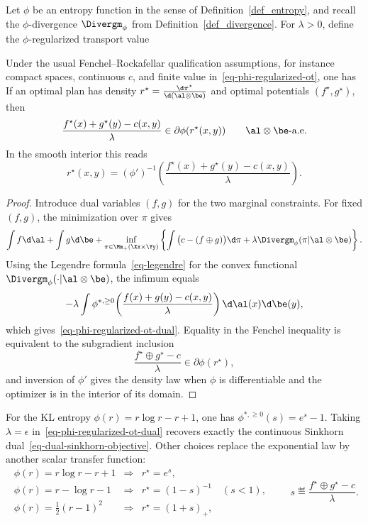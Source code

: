 Let $\phi$ be an entropy function in the sense of Definition~\ref{def_entropy}, and recall the $\phi$-divergence $\Divergm_\phi$ from Definition~\ref{def_divergence}. For $\lambda>0$, define the $\phi$-regularized transport value

\begin{prop}\label{prop-phi-regularized-ot-dual}
	Under the usual Fenchel--Rockafellar qualification assumptions, for instance compact spaces, continuous $c$, and finite value in~\eqref{eq-phi-regularized-ot}, one has
	If an optimal plan has density $r^\star=\frac{\d\pi^\star}{\d(\al\otimes\be)}$ and optimal potentials $(f^\star,g^\star)$, then
	\[
		\frac{f^\star(x)+g^\star(y)-c(x,y)}{\lambda}
		\in
		\partial\phi(r^\star(x,y))
		\qquad
		\al\otimes\be\text{-a.e.}
	\]
	In the smooth interior this reads
	\[
		r^\star(x,y)
		=
		(\phi')^{-1}
		\!\left(\frac{f^\star(x)+g^\star(y)-c(x,y)}{\lambda}\right).
	\]
\end{prop}

\begin{proof}
	Introduce dual variables $(f,g)$ for the two marginal constraints. For fixed $(f,g)$, the minimization over $\pi$ gives
	\[
		\int f\d\al+\int g\d\be
		+
		\inf_{\pi\in\Mm_+(\Xx\times\Yy)}
		\left\{
		\int\big(c-(f\oplus g)\big)\d\pi
		+
		\lambda\Divergm_\phi(\pi|\al\otimes\be)
		\right\}.
	\]
	Using the Legendre formula~\eqref{eq-legendre} for the convex functional $\Divergm_\phi(\cdot|\al\otimes\be)$, the infimum equals
	\[
		-\lambda
		\int
		\phi^{*,\geq0}\!\left(\frac{f(x)+g(y)-c(x,y)}{\lambda}\right)
		\d\al(x)\d\be(y),
	\]
	which gives~\eqref{eq-phi-regularized-ot-dual}. Equality in the Fenchel inequality is equivalent to the subgradient inclusion
	\[
		\frac{f^\star\oplus g^\star-c}{\lambda}
		\in
		\partial\phi(r^\star),
	\]
	and inversion of $\phi'$ gives the density law when $\phi$ is differentiable and the optimizer is in the interior of its domain.
\end{proof}

For the KL entropy $\phi(r)=r\log r-r+1$, one has $\phi^{*,\geq0}(s)=e^s-1$. Taking $\lambda=\epsilon$ in~\eqref{eq-phi-regularized-ot-dual} recovers exactly the continuous Sinkhorn dual~\eqref{eq-dual-sinkhorn-objective}. Other choices replace the exponential law by another scalar transfer function:
\[
\begin{array}{lll}
	\phi(r)=r\log r-r+1 &\Rightarrow& r^\star=e^s,\\[.25em]
	\phi(r)=r-\log r-1 &\Rightarrow& r^\star=(1-s)^{-1}\quad (s<1),\\[.25em]
	\phi(r)=\frac12(r-1)^2 &\Rightarrow& r^\star=(1+s)_+,
\end{array}
\qquad
s\eqdef\frac{f^\star\oplus g^\star-c}{\lambda}.
\]

